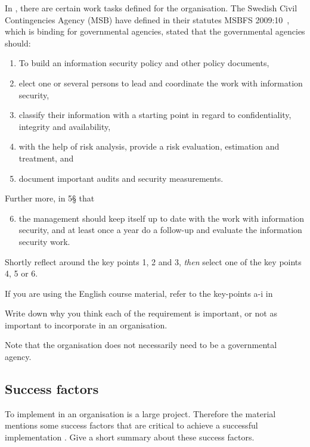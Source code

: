 \documentclass[a4paper]{llncs}
\begin{document}
In , there are certain work tasks defined for the organisation.
The Swedish Civil Contingencies Agency (MSB) have defined in their statutes
MSBFS 2009:10~\cite{MSBFS2009:10}, which is binding for governmental agencies, 
stated that the governmental agencies should:
\begin{enumerate}
  \item To build an information security policy and other policy documents,
  \item elect one or several persons to lead and coordinate the work with
    information security,
  \item classify their information with a starting point in regard to
    confidentiality, integrity and availability,
  \item with the help of risk analysis, provide a risk evaluation, estimation
    and treatment, and
  \item document important audits and security measurements.
\end{enumerate}
Further more, in 5§ that

\begin{enumerate}\setcounter{enumi}{5}
  \item the management should keep itself up to date with the work with
    information security, and at least once a year do a follow-up and evaluate
    the information security work.
\end{enumerate}

Shortly reflect around the key points 1, 2 and 3, \emph{then} select one of the key
points 4, 5 or 6.

If you are using the English course material, refer to the key-points a-i in
\cite[chap. 3.2.1]{iso27000}

Write down why you think each of the requirement is important, or not as
important to incorporate in an organisation.

Note that the organisation does not necessarily need to be a governmental
agency.

\subsection{Success factors}

To implement  in an organisation is a large project. Therefore
the material mentions some success factors that are critical to achieve a
successful implementation \cite[3.6]{iso27000}. Give a short summary about
these success factors.
\end{document}
